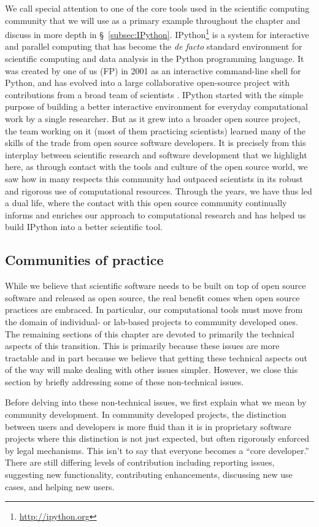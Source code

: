 \documentclass[ChapterTOCs,krantz2]{krantz} %
\begin{document}
We call special attention to one of the core tools used in the scientific
computing community that we will use as a primary example throughout the
chapter and discuss in more depth in §~\ref{subsec:IPython}.
IPython\footnote{\url{http://ipython.org}} is a system for interactive and
parallel computing that has become the \emph{de facto} standard environment for
scientific computing and data analysis in the Python programming language.  It
was created by one of us (FP) in 2001 as an interactive command-line shell for
Python, and has evolved into a large collaborative open-source project with
contributions from a broad team of scientists \cite{PER-GRA:2007}.  IPython
started with the simple purpose of building a better interactive environment
for everyday computational work by a single researcher.  But as it grew into a
broader open source project, the team working on it (most of them practicing
scientists) learned many of the skills of the trade from open source software
developers.  It is precisely from this interplay between scientific research
and software development that we highlight here, as through contact with the
tools and culture of the open source world, we saw how in many respects this
community had outpaced scientists in its robust and rigorous use of
computational resources.  Through the years, we have thus led a dual life,
where the contact with this open source community continually informs and
enriches our approach to computational research and has helped us build IPython
into a better scientific tool.

\subsection{\label{subsec:community}Communities of practice}

While we believe that scientific software needs to be built on top of open
source software and released as open source, the real benefit comes when open
source practices are embraced. In particular, our computational tools must move
from the domain of individual- or lab-based projects to community developed
ones. The remaining sections of this chapter are devoted to primarily the
technical aspects of this transition. This is primarily because these issues
are more tractable and in part because we believe that getting these technical
aspects out of the way will make dealing with other issues simpler. However, we
close this section by briefly addressing some of these non-technical issues.

Before delving into these non-technical issues, we first explain what we mean
by community development. In community developed projects, the distinction
between users and developers is more fluid than it is in proprietary software
projects where this distinction is not just expected, but often rigorously
enforced by legal mechanisms. This isn't to say that everyone becomes a ``core
developer.'' There are still differing levels of contribution including
reporting issues, suggesting new functionality, contributing enhancements,
discussing new use cases, and helping new users.
\end{document}
